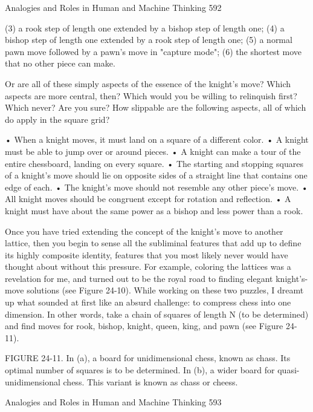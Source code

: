 Analogies and Roles in Human and Machine Thinking                                     592

(3) a rook step of length one extended by a bishop step of length one;
(4) a bishop step of length one extended by a rook step of length one;
(5) a normal pawn move followed by a pawn's move in "capture mode";
(6) the shortest move that no other piece can make.

Or are all of these simply aspects of the essence of the knight's move? Which aspects
are more central, then? Which would you be willing to relinquish first? Which never?
Are you sure? How slippable are the following aspects, all of which do apply in the
square grid?

•      When a knight moves, it must land on a square of a different color.
•      A knight must be able to jump over or around pieces.
•      A knight can make a tour of the entire chessboard, landing on every square.
•      The starting and stopping squares of a knight's move should lie on opposite
       sides of a straight line that contains one edge of each.
•      The knight's move should not resemble any other piece's move.
•      All knight moves should be congruent except for rotation and reflection.
•      A knight must have about the same power as a bishop and less power than a
       rook.

Once you have tried extending the concept of the knight's move to another lattice,
then you begin to sense all the subliminal features that add up to define its highly
composite identity, features that you most likely never would have thought about
without this pressure. For example, coloring the lattices was a revelation for me, and
turned out to be the royal road to finding elegant knight's-move solutions (see Figure
24-10).
        While working on these two puzzles, I dreamt up what sounded at first like an
absurd challenge: to compress chess into one dimension. In other words, take a chain
of squares of length N (to be determined) and find moves for rook, bishop, knight,
queen, king, and pawn (see Figure 24-11).




FIGURE 24-11. In (a), a board for unidimensional chess, known as chass. Its optimal
number of squares is to be determined. In (b), a wider board for quasi-unidimensional
chess. This variant is known as chass or cheess.

Analogies and Roles in Human and Machine Thinking                                 593

